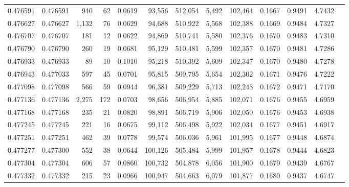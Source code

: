 \begin{tabular}{rrrrrrrrrrrrr}
0.476591 & 0.476591 &   940 &    62 &                                     0.0619 &  93,556 & 512,054 &   5,492 & 102,464 & 0.1667 & 0.9491 & 4.7432 \\
0.476627 & 0.476627 & 1,132 &    76 &                                     0.0629 &  94,688 & 510,922 &   5,568 & 102,388 & 0.1669 & 0.9484 & 4.7327 \\
0.476707 & 0.476707 &   181 &    12 &                                     0.0622 &  94,869 & 510,741 &   5,580 & 102,376 & 0.1670 & 0.9483 & 4.7310 \\
0.476790 & 0.476790 &   260 &    19 &                                     0.0681 &  95,129 & 510,481 &   5,599 & 102,357 & 0.1670 & 0.9481 & 4.7286 \\
0.476933 & 0.476933 &    89 &    10 &                                     0.1010 &  95,218 & 510,392 &   5,609 & 102,347 & 0.1670 & 0.9480 & 4.7278 \\
0.476943 & 0.477033 &   597 &    45 &                                     0.0701 &  95,815 & 509,795 &   5,654 & 102,302 & 0.1671 & 0.9476 & 4.7222 \\
0.477098 & 0.477098 &   566 &    59 &                                     0.0944 &  96,381 & 509,229 &   5,713 & 102,243 & 0.1672 & 0.9471 & 4.7170 \\
0.477136 & 0.477136 & 2,275 &   172 &                                     0.0703 &  98,656 & 506,954 &   5,885 & 102,071 & 0.1676 & 0.9455 & 4.6959 \\
0.477168 & 0.477168 &   235 &    21 &                                     0.0820 &  98,891 & 506,719 &   5,906 & 102,050 & 0.1676 & 0.9453 & 4.6938 \\
0.477245 & 0.477245 &   221 &    16 &                                     0.0675 &  99,112 & 506,498 &   5,922 & 102,034 & 0.1677 & 0.9451 & 4.6917 \\
0.477251 & 0.477251 &   462 &    39 &                                     0.0778 &  99,574 & 506,036 &   5,961 & 101,995 & 0.1677 & 0.9448 & 4.6874 \\
0.477277 & 0.477300 &   552 &    38 &                                     0.0644 & 100,126 & 505,484 &   5,999 & 101,957 & 0.1678 & 0.9444 & 4.6823 \\
0.477304 & 0.477304 &   606 &    57 &                                     0.0860 & 100,732 & 504,878 &   6,056 & 101,900 & 0.1679 & 0.9439 & 4.6767 \\
0.477332 & 0.477332 &   215 &    23 &                                     0.0966 & 100,947 & 504,663 &   6,079 & 101,877 & 0.1680 & 0.9437 & 4.6747 \\

\end{tabular}
